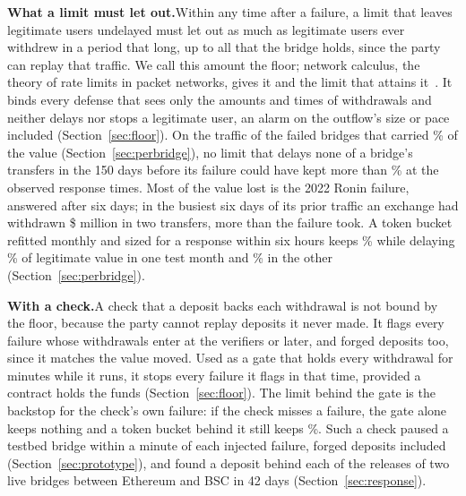 \documentclass[conference,compsoc]{IEEEtran}
\numberwithin{equation}{section}
\theoremstyle{plain}
\theoremstyle{definition}
\theoremstyle{remark}
\newcommand{\runin}[1]{\par\smallskip\noindent\textbf{#1.}\enspace}
\begin{document}
\runin{What a limit must let out}Within any time after a failure, a limit that leaves legitimate users undelayed must let out as much as legitimate users ever withdrew in a period that long, up to all that the bridge holds, since the party can replay that traffic. We call this amount the floor; network calculus, the theory of rate limits in packet networks, gives it and the limit that attains it~\cite{leboudec2001}. It binds every defense that sees only the amounts and times of withdrawals and neither delays nor stops a legitimate user, an alarm on the outflow's size or pace included (Section~\ref{sec:floor}). On the traffic of the \pbNWords{} failed bridges that carried \pbValueSharePct\% of the value (Section~\ref{sec:perbridge}), no limit that delays none of a bridge's transfers in the 150 days before its failure could have kept more than \pbFloorPctR\% at the observed response times. Most of the value lost is the 2022 Ronin failure, answered after six days; in the busiest six days of its prior traffic an exchange had withdrawn \$\pbRoninOutsizedM{} million in two transfers, more than the failure took. A token bucket refitted monthly and sized for a response within six hours keeps \pbBucketPctR\% while delaying \pbBucketDelayedPct\% of legitimate value in one test month and \pbBucketDelayedTwoPct\% in the other (Section~\ref{sec:perbridge}).

\runin{With a check}A check that a deposit backs each withdrawal is not bound by the floor, because the party cannot replay deposits it never made. It flags every failure whose withdrawals enter at the verifiers or later, and forged deposits too, since it matches the value moved. Used as a gate that holds every withdrawal for \pbGateMin{} minutes while it runs, it stops every failure it flags in that time, provided a contract holds the funds (Section~\ref{sec:floor}). The limit behind the gate is the backstop for the check's own failure: if the check misses a failure, the gate alone keeps nothing and a token bucket behind it still keeps \pbBucketPctR\%. Such a check paused a testbed bridge within a minute of each injected failure, forged deposits included (Section~\ref{sec:prototype}), and found a deposit behind each of the \shRel{} releases of two live bridges between Ethereum and BSC in 42 days (Section~\ref{sec:response}).
\end{document}
